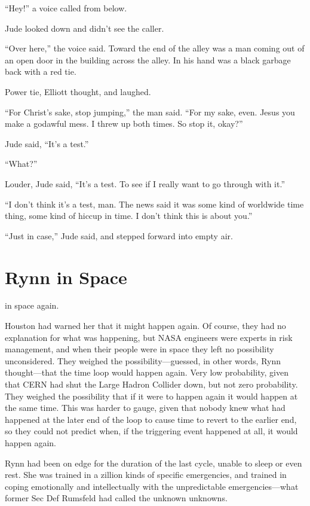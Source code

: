 “Hey!” a voice called from below.

Jude looked down and didn’t see the caller.

“Over here,” the voice said. Toward the end of the alley was a man coming out of an open door in the building across the alley. In his hand was a black garbage back with a red tie.

Power tie, Elliott thought, and laughed.

“For Christ’s sake, stop jumping,” the man said. “For my sake, even. Jesus you make a godawful mess. I threw up both times. So stop it, okay?”

Jude said, “It’s a test.”

“What?”

Louder, Jude said, “It’s a test. To see if I really want to go through with it.”

“I don’t think it’s a test, man. The news said it was some kind of worldwide time thing, some kind of hiccup in time. I don’t think this is about you.”

“Just in case,” Jude said, and stepped forward into empty air.



\section{Rynn in Space}

 in space again.

Houston had warned her that it might happen again. Of course, they had no explanation for what was happening, but NASA engineers were experts in risk management, and when their people were in space they left no possibility unconsidered. They weighed the possibility—guessed, in other words, Rynn thought—that the time loop would happen again. Very low probability, given that CERN had shut the Large Hadron Collider down, but not zero probability. They weighed the possibility that if it were to happen again it would happen at the same time. This was harder to gauge, given that nobody knew what had happened at the later end of the loop to cause time to revert to the earlier end, so they could not predict when, if the triggering event happened at all, it would happen again.

Rynn had been on edge for the duration of the last cycle, unable to sleep or even rest. She was trained in a zillion kinds of specific emergencies, and trained in coping emotionally and intellectually with the unpredictable emergencies—what former Sec Def Rumsfeld had called the unknown unknowns.

